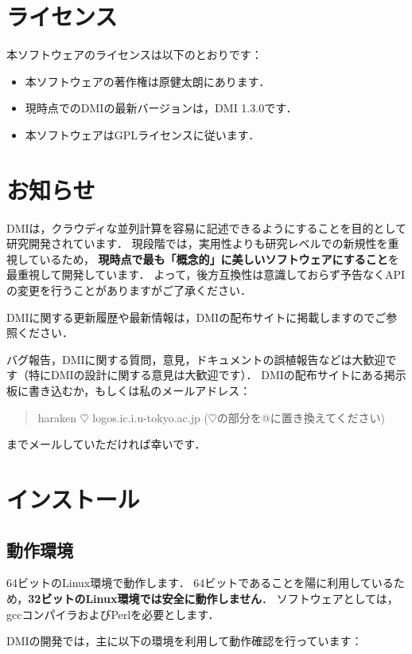 \documentclass[report,12pt]{jsbook}
\begin{document}
\section{ライセンス}

本ソフトウェアのライセンスは以下のとおりです：

\begin{itemize}
\item 本ソフトウェアの著作権は原健太朗にあります．
\item 現時点でのDMIの最新バージョンは，DMI 1.3.0です．
\item 本ソフトウェアはGPLライセンスに従います．
\end{itemize}

\section{お知らせ}

DMIは，クラウディな並列計算を容易に記述できるようにすることを目的として研究開発されています．
現段階では，実用性よりも研究レベルでの新規性を重視しているため，
\textbf{現時点で最も「概念的」に美しいソフトウェアにすること}を最重視して開発しています．
よって，後方互換性は意識しておらず予告なくAPIの変更を行うことがありますがご了承ください．

DMIに関する更新履歴や最新情報は，DMIの配布サイトに掲載しますのでご参照ください．

バグ報告，DMIに関する質問，意見，ドキュメントの誤植報告などは大歓迎です（特にDMIの設計に関する意見は大歓迎です）．
DMIの配布サイトにある掲示板に書き込むか，もしくは私のメールアドレス：
\begin{quote}
  haraken $\heartsuit$ logos.ic.i.u-tokyo.ac.jp ($\heartsuit$の部分を@に置き換えてください)
\end{quote}
までメールしていただければ幸いです．

\section{インストール}

\subsection{動作環境}

64ビットのLinux環境で動作します．
64ビットであることを陽に利用しているため，\textbf{32ビットのLinux環境では安全に動作しません}．
ソフトウェアとしては，gccコンパイラおよびPerlを必要とします．

DMIの開発では，主に以下の環境を利用して動作確認を行っています：
\end{document}
